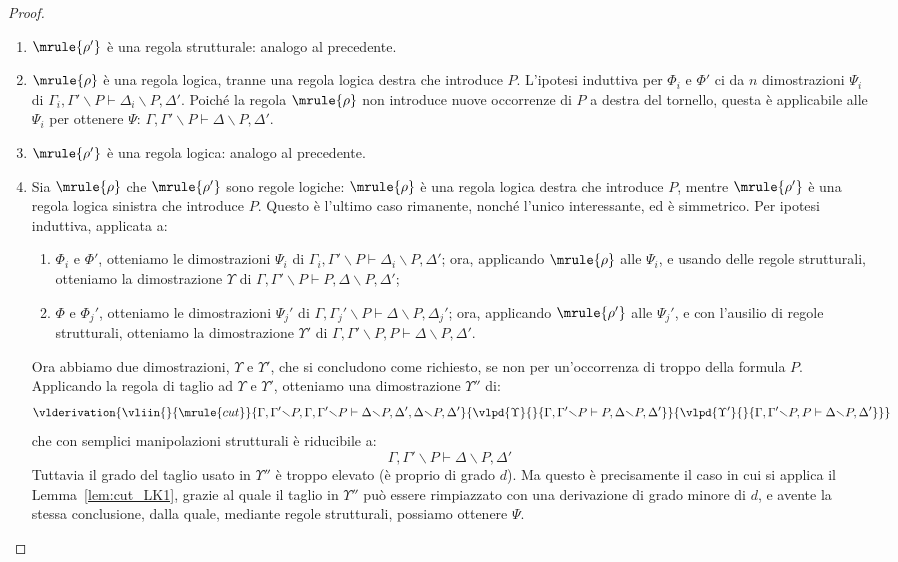 \documentclass[12pt,a4paper,openright,twoside]{report}
\begin{document}
\begin{proof}
\begin{enumerate}
	\item $\mrule{\rho'}$ \`e una regola strutturale: analogo al precedente. 
	\item $\mrule{\rho}$ \`e una regola logica, tranne una regola logica destra che introduce $P$. L'ipotesi induttiva per $\Phi_i$ e $\Phi'$ ci da $n$ dimostrazioni $\Psi_i$ di $\Gamma_i, \Gamma'{\smallsetminus}P \vdash \Delta_i{\smallsetminus}P, \Delta'$. Poich\'e la regola $\mrule{\rho}$ non introduce nuove occorrenze di $P$ a destra del tornello, questa \`e applicabile alle $\Psi_i$ per ottenere $\Psi$: $\Gamma, \Gamma'{\smallsetminus}P \vdash \Delta{\smallsetminus}P, \Delta'$.
	\item $\mrule{\rho'}$ \`e una regola logica: analogo al precedente. 
	\item Sia $\mrule{\rho}$ che $\mrule{\rho'}$ sono regole logiche: $\mrule{\rho}$ \`e una regola logica destra che introduce $P$, mentre $\mrule{\rho'}$ \`e una regola logica sinistra che introduce $P$. Questo \`e l'ultimo caso rimanente, nonch\'e l'unico interessante, ed \`e simmetrico. Per ipotesi induttiva, applicata a:
	\begin{enumerate}
		\item $\Phi_i$ e $\Phi'$, otteniamo le dimostrazioni $\Psi_i$ di $\Gamma_i, \Gamma'{\smallsetminus}P \vdash \Delta_i{\smallsetminus}P, \Delta'$; ora, applicando $\mrule{\rho}$ alle $\Psi_i$, e usando delle regole strutturali, otteniamo la dimostrazione $\Upsilon$ di $\Gamma, \Gamma'{\smallsetminus}P \vdash P, \Delta{\smallsetminus}P, \Delta'$;
		\item $\Phi$ e $\Phi_j'$, otteniamo le dimostrazioni $\Psi_j'$ di $\Gamma, \Gamma_j'{\smallsetminus}P \vdash \Delta{\smallsetminus}P, \Delta_j'$; ora, applicando $\mrule{\rho'}$ alle $\Psi_j'$, e con l'ausilio di regole strutturali, otteniamo la dimostrazione $\Upsilon'$ di $\Gamma, \Gamma'{\smallsetminus}P, P \vdash \Delta{\smallsetminus}P, \Delta'$.
	\end{enumerate}
	Ora abbiamo due dimostrazioni, $\Upsilon$ e $\Upsilon'$, che si concludono come richiesto, se non per un'occorrenza di troppo della formula $P$. Applicando la regola di taglio ad $\Upsilon$ e $\Upsilon'$, otteniamo una dimostrazione $\Upsilon''$ di:
$$
	\vlderivation{
		\vliin{}{\mrule{cut}}
			{\Gamma, \Gamma'{\smallsetminus}P, \Gamma, \Gamma'{\smallsetminus}P \vdash \Delta{\smallsetminus}P, \Delta', \Delta{\smallsetminus}P, \Delta'}
			{\vlpd{\Upsilon}{}{\Gamma, \Gamma'{\smallsetminus}P \vdash P, \Delta{\smallsetminus}P, \Delta'}}
			{\vlpd{\Upsilon'}{}{\Gamma, \Gamma'{\smallsetminus}P, P \vdash \Delta{\smallsetminus}P, \Delta'}}
	}
$$
che con semplici manipolazioni strutturali \`e riducibile a: 
$$
	\Gamma, \Gamma'{\smallsetminus}P \vdash \Delta{\smallsetminus}P, \Delta'
$$
Tuttavia il grado del taglio usato in $\Upsilon''$ \`e troppo elevato (\`e proprio di grado $d$). Ma questo \`e precisamente il caso in cui si applica il Lemma~\ref{lem:cut_LK1}, grazie al quale il taglio in $\Upsilon''$ pu\`o essere rimpiazzato con una derivazione di grado minore di $d$, e avente la stessa conclusione, dalla quale, mediante regole strutturali, possiamo ottenere $\Psi$.
\end{enumerate}
\end{proof}
\end{document}
